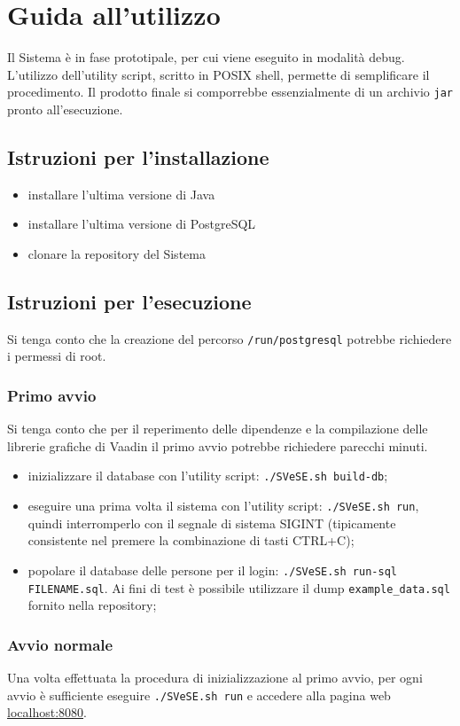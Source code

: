 \chapter{Guida all'utilizzo}
Il Sistema è in fase prototipale, per cui viene eseguito in modalità debug. L'utilizzo dell'utility script, scritto in POSIX shell, permette di semplificare il procedimento. Il prodotto finale si comporrebbe essenzialmente di un archivio \verb!jar! pronto all'esecuzione.




\section{Istruzioni per l'installazione}
\begin{itemize}
\item installare l'ultima versione di Java
\item installare l'ultima versione di PostgreSQL
\item clonare la repository del Sistema
\end{itemize}




\section{Istruzioni per l'esecuzione}
Si tenga conto che la creazione del percorso \verb!/run/postgresql! potrebbe richiedere i permessi di root.

\subsection{Primo avvio}
Si tenga conto che per il reperimento delle dipendenze e la compilazione delle librerie grafiche di Vaadin il primo avvio potrebbe richiedere parecchi minuti.
\begin{itemize}
	\item inizializzare il database con l'utility script: \verb!./SVeSE.sh build-db!;
	\item eseguire una prima volta il sistema con l'utility script: \verb!./SVeSE.sh run!, quindi interromperlo con il segnale di sistema SIGINT (tipicamente consistente nel premere la combinazione di tasti CTRL+C);
	\item popolare il database delle persone per il login: \verb!./SVeSE.sh run-sql FILENAME.sql!. Ai fini di test è possibile utilizzare il dump \verb!example_data.sql! fornito nella repository;
\end{itemize}

\subsection{Avvio normale}
Una volta effettuata la procedura di inizializzazione al primo avvio, per ogni avvio è sufficiente eseguire \verb!./SVeSE.sh run! e accedere alla pagina web \url{localhost:8080}.
